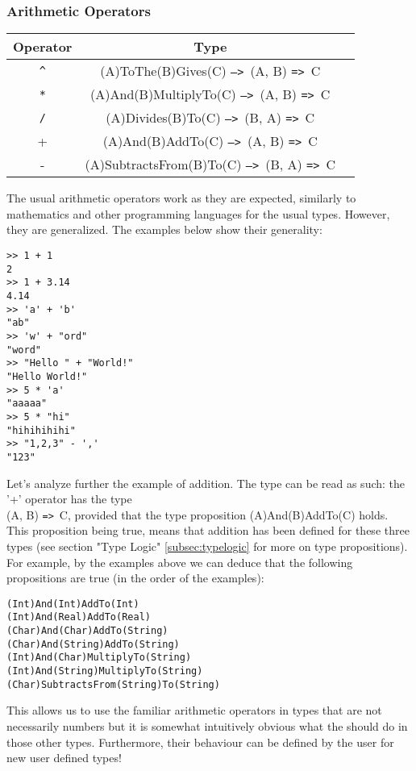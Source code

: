 \documentclass{article}
\def\ra{\texttt{=>}\ }
\def\Ra{\texttt{-->}\ }
\begin{document}
\subsubsection{Arithmetic Operators}
\begin{center}
\begin{tabular}{ |c|c|c| } 
\hline
Operator & Type \\ 
\hline
\hline
\texttt{\^} & (A)ToThe(B)Gives(C) \Ra (A, B) \ra C \\
\hline
\texttt{*} & (A)And(B)MultiplyTo(C) \Ra (A, B) \ra C \\
\hline
\texttt{/} & (A)Divides(B)To(C) \Ra (B, A) \ra C \\
\hline
+ & (A)And(B)AddTo(C) \Ra (A, B) \ra C \\ 
\hline
- & (A)SubtractsFrom(B)To(C) \Ra (B, A) \ra C \\
\hline
\end{tabular}
\end{center}
The usual arithmetic operators work as they are expected, similarly to
mathematics and other programming languages for the usual types. However, they
are generalized. The examples below show their generality:
\begin{verbatim}
>> 1 + 1
2
>> 1 + 3.14
4.14
>> 'a' + 'b'
"ab"
>> 'w' + "ord"
"word"
>> "Hello " + "World!"
"Hello World!"
>> 5 * 'a'
"aaaaa"
>> 5 * "hi"
"hihihihihi"
>> "1,2,3" - ','
"123"
\end{verbatim}
Let's analyze further the example of addition. The type can be read as such:
the '+' operator has the type \\ (A, B) \ra C, provided that the type
proposition (A)And(B)AddTo(C) holds. This proposition being true, means that
addition has been defined for these three types (see section "Type Logic"
\ref{subsec:typelogic} for more on type propositions). For example, by the examples
above we can deduce that the following propositions are true (in the order of the 
examples):
\begin{verbatim}
(Int)And(Int)AddTo(Int)
(Int)And(Real)AddTo(Real)
(Char)And(Char)AddTo(String)
(Char)And(String)AddTo(String)
(Int)And(Char)MultiplyTo(String)
(Int)And(String)MultiplyTo(String)
(Char)SubtractsFrom(String)To(String)
\end{verbatim}
This allows us to use the familiar arithmetic operators in types that are not
necessarily numbers but it is somewhat intuitively obvious what the should do
in those other types. Furthermore, their behaviour can be defined by the user
for new user defined types!
\end{document}
